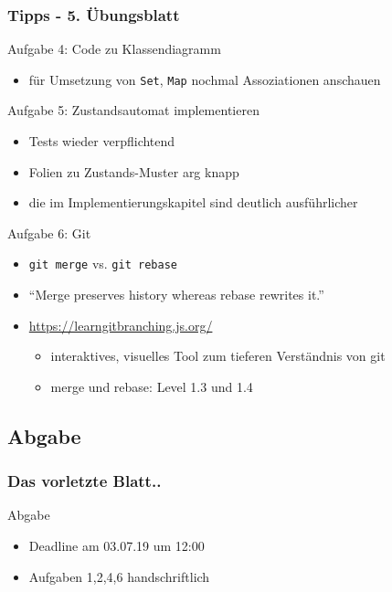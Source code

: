 \documentclass[18pt]{beamer}
\begin{document}
	\begin{frame}
		\frametitle{Tipps - 5. Übungsblatt}
			\begin{exampleblock}{Aufgabe 4: Code zu Klassendiagramm}
				\begin{itemize}
					\item für Umsetzung von \texttt{Set}, \texttt{Map} nochmal Assoziationen anschauen
				\end{itemize}
			\end{exampleblock}
			\pause
			\begin{exampleblock}{Aufgabe 5: Zustandsautomat implementieren}
				\begin{itemize}
					\item Tests wieder verpflichtend
					\item Folien zu Zustands-Muster arg knapp
					\item die im Implementierungskapitel sind deutlich ausführlicher
				\end{itemize}
			\end{exampleblock}
			\pause
			\begin{exampleblock}{Aufgabe 6: Git}
				\begin{itemize}
					\item \texttt{git merge} vs. \texttt{git rebase}
					\item \enquote{Merge preserves history whereas rebase rewrites it.}
					\item \url{https://learngitbranching.js.org/}
					\begin{itemize}
						\item interaktives, visuelles Tool zum tieferen Verständnis von git
						\item merge und rebase: Level 1.3 und 1.4
					\end{itemize}
 				\end{itemize}
			\end{exampleblock}
	\end{frame}
	
	\subsection{Abgabe}
	\begin{frame}
		\frametitle{Das vorletzte Blatt..}
		\begin{alertblock}{Abgabe}
			\begin{itemize}
				\item Deadline am 03.07.19 um 12:00
				\item Aufgaben 1,2,4,6 handschriftlich
			\end{itemize}
		\end{alertblock}
	\end{frame}
		
\end{document}
